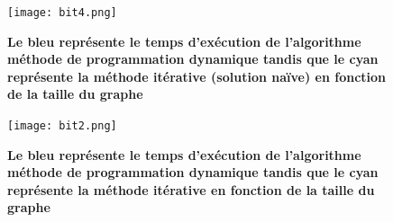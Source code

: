 \documentclass[12pt, openany]{report}
\begin{document}
\begin{figure}[h]
	\begin{center}
		\centering
		\texttt{[image: bit4.png]}~\\[0.1mm]
	\end{center}
	\caption{\textbf{Le bleu représente le temps d'exécution de l'algorithme méthode de programmation dynamique tandis que le cyan représente la méthode itérative (solution naïve) en fonction de la taille du graphe}}
	\label{Graphe}
\end{figure}
\begin{figure}[h]
	\begin{center}
		\centering
		\texttt{[image: bit2.png]}~\\[0.1mm]
	\end{center}
	\caption{\textbf{Le bleu représente le temps d'exécution de l'algorithme méthode de programmation dynamique tandis que le cyan représente la méthode itérative en fonction de la taille du graphe}}
	\label{Graphe}
\end{figure}
\end{document}
